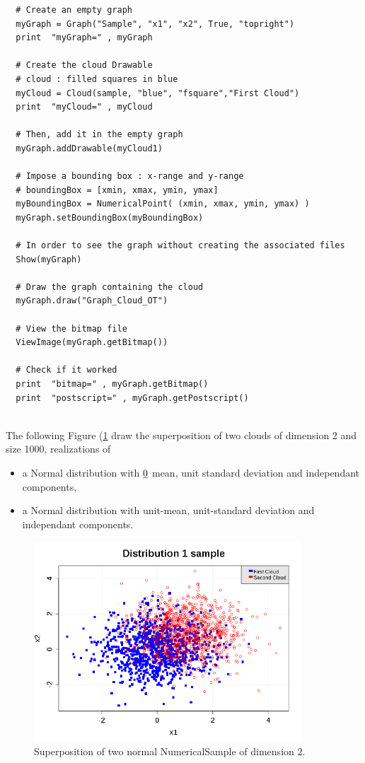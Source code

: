 \begin{lstlisting}
  # Create an empty graph
  myGraph = Graph("Sample", "x1", "x2", True, "topright")
  print  "myGraph=" , myGraph

  # Create the cloud Drawable
  # cloud : filled squares in blue
  myCloud = Cloud(sample, "blue", "fsquare","First Cloud")
  print  "myCloud=" , myCloud

  # Then, add it in the empty graph
  myGraph.addDrawable(myCloud1)

  # Impose a bounding box : x-range and y-range
  # boundingBox = [xmin, xmax, ymin, ymax]
  myBoundingBox = NumericalPoint( (xmin, xmax, ymin, ymax) )
  myGraph.setBoundingBox(myBoundingBox)

  # In order to see the graph without creating the associated files
  Show(myGraph)

  # Draw the graph containing the cloud
  myGraph.draw("Graph_Cloud_OT")

  # View the bitmap file
  ViewImage(myGraph.getBitmap())

  # Check if it worked
  print  "bitmap=" , myGraph.getBitmap()
  print  "postscript=" , myGraph.getPostscript()
\end{lstlisting}
\textspace\\



The following Figure (\ref{cloud2} draw the superposition of two clouds of dimension 2 and size 1000, realizations of
\begin{itemize}
\item a Normal distribution with ${\underline{0}}$ mean, unit standard deviation and independant components,
\item a Normal distribution with unit-mean,  unit-standard deviation and independant components.
\end{itemize}

\begin{figure}[H]
  \begin{center}
    \includegraphics[width=10cm]{cloud2.png}
  \end{center}
  \caption{Superposition of two normal NumericalSample of dimension 2.}
  \label{cloud2}
\end{figure}

